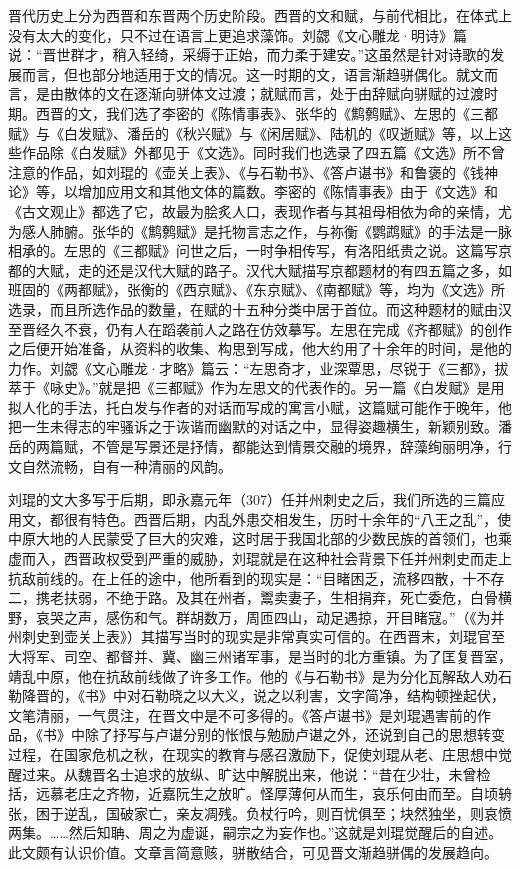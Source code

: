 晋代历史上分为西晋和东晋两个历史阶段。西晋的文和赋，与前代相比，在体式上没有太大的变化，只不过在语言上更追求藻饰。刘勰《文心雕龙·明诗》篇说：“晋世群才，稍入轻绮，采缛于正始，而力柔于建安。”这虽然是针对诗歌的发展而言，但也部分地适用于文的情况。这一时期的文，语言渐趋骈偶化。就文而言，是由散体的文在逐渐向骈体文过渡；就赋而言，处于由辞赋向骈赋的过渡时期。西晋的文，我们选了李密的《陈情事表》、张华的《鹪鹩赋》、左思的《三都赋》与《白发赋》、潘岳的《秋兴赋》与《闲居赋》、陆机的《叹逝赋》等，以上这些作品除《白发赋》外都见于《文选》。同时我们也选录了四五篇《文选》所不曾注意的作品，如刘琨的《壶关上表》、《与石勒书》、《答卢谌书》和鲁褒的《钱神论》等，以增加应用文和其他文体的篇数。李密的《陈情事表》由于《文选》和《古文观止》都选了它，故最为脍炙人口，表现作者与其祖母相依为命的亲情，尤为感人肺腑。张华的《鹪鹩赋》是托物言志之作，与祢衡《鹦鹉赋》的手法是一脉相承的。左思的《三都赋》问世之后，一时争相传写，有洛阳纸贵之说。这篇写京都的大赋，走的还是汉代大赋的路子。汉代大赋描写京都题材的有四五篇之多，如班固的《两都赋》，张衡的《西京赋》、《东京赋》、《南都赋》等，均为《文选》所选录，而且所选作品的数量，在赋的十五种分类中居于首位。而这种题材的赋由汉至晋经久不衰，仍有人在蹈袭前人之路在仿效摹写。左思在完成《齐都赋》的创作之后便开始准备，从资料的收集、构思到写成，他大约用了十余年的时间，是他的力作。刘勰《文心雕龙·才略》篇云：“左思奇才，业深覃思，尽锐于《三都》，拔萃于《咏史》。”就是把《三都赋》作为左思文的代表作的。另一篇《白发赋》是用拟人化的手法，托白发与作者的对话而写成的寓言小赋，这篇赋可能作于晚年，他把一生未得志的牢骚诉之于诙谐而幽默的对话之中，显得姿趣横生，新颖别致。潘岳的两篇赋，不管是写景还是抒情，都能达到情景交融的境界，辞藻绚丽明净，行文自然流畅，自有一种清丽的风韵。

刘琨的文大多写于后期，即永嘉元年（307）任并州刺史之后，我们所选的三篇应用文，都很有特色。西晋后期，内乱外患交相发生，历时十余年的“八王之乱”，使中原大地的人民蒙受了巨大的灾难，这时居于我国北部的少数民族的首领们，也乘虚而入，西晋政权受到严重的威胁，刘琨就是在这种社会背景下任并州刺史而走上抗敌前线的。在上任的途中，他所看到的现实是：“目睹困乏，流移四散，十不存二，携老扶弱，不绝于路。及其在州者，鬻卖妻子，生相捐弃，死亡委危，白骨横野，哀哭之声，感伤和气。群胡数万，周匝四山，动足遇掠，开目睹寇。”（《为并州刺史到壶关上表》）其描写当时的现实是非常真实可信的。在西晋末，刘琨官至大将军、司空、都督并、冀、幽三州诸军事，是当时的北方重镇。为了匡复晋室，靖乱中原，他在抗敌前线做了许多工作。他的《与石勒书》是为分化瓦解敌人劝石勒降晋的，《书》中对石勒晓之以大义，说之以利害，文字简净，结构顿挫起伏，文笔清丽，一气贯注，在晋文中是不可多得的。《答卢谌书》是刘琨遇害前的作品，《书》中除了抒写与卢谌分别的怅恨与勉励卢谌之外，还说到自己的思想转变过程，在国家危机之秋，在现实的教育与感召激励下，促使刘琨从老、庄思想中觉醒过来。从魏晋名士追求的放纵、旷达中解脱出来，他说：“昔在少壮，未曾检括，远慕老庄之齐物，近嘉阮生之放旷。怪厚薄何从而生，哀乐何由而至。自顷辀张，困于逆乱，国破家亡，亲友凋残。负杖行吟，则百忧俱至；块然独坐，则哀愤两集。……然后知聃、周之为虚诞，嗣宗之为妄作也。”这就是刘琨觉醒后的自述。此文颇有认识价值。文章言简意赅，骈散结合，可见晋文渐趋骈偶的发展趋向。

